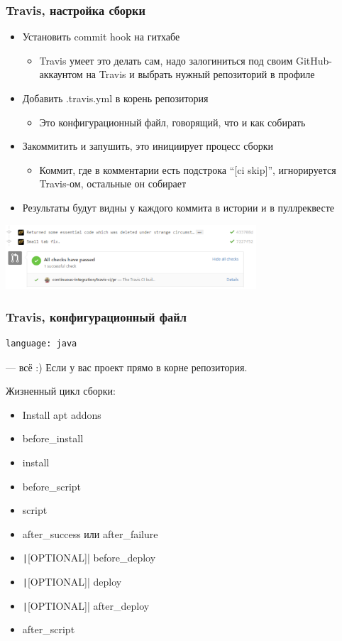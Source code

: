 \documentclass[xetex,mathserif,serif]{beamer}
\begin{document}
	\begin{frame}
		\frametitle{Travis, настройка сборки}
		\begin{itemize}
			\item Установить commit hook на гитхабе
			\begin{itemize}
				\item Travis умеет это делать сам, надо залогиниться под своим GitHub-аккаунтом на Travis и выбрать нужный репозиторий в профиле
			\end{itemize}
			\item Добавить .travis.yml в корень репозитория
			\begin{itemize}
				\item Это конфигурационный файл, говорящий, что и как собирать
			\end{itemize}
			\item Закоммитить и запушить, это инициирует процесс сборки
			\begin{itemize}
				\item Коммит, где в комментарии есть подстрока ``[ci skip]'', игнорируется Travis-ом, остальные он собирает
			\end{itemize}
			\item Результаты будут видны у каждого коммита в истории и в пуллреквесте
		\end{itemize}
		\begin{center}
			\includegraphics[width=0.7\textwidth]{travisSuccess.png}
		\end{center}
	\end{frame}

	\begin{frame}[fragile]
		\frametitle{Travis, конфигурационный файл}
		\begin{verbatim}
language: java
		\end{verbatim}
		--- всё :) Если у вас проект прямо в корне репозитория.

		Жизненный цикл сборки:
		\begin{footnotesize}
			\begin{itemize}
				\item Install apt addons
				\item before\_install
				\item install
				\item before\_script
				\item script
				\item after\_success или after\_failure
				\item \texttt|[OPTIONAL]| before\_deploy
				\item \texttt|[OPTIONAL]| deploy
				\item \texttt|[OPTIONAL]| after\_deploy
				\item after\_script
			\end{itemize}
		\end{footnotesize}
	\end{frame}
\end{document}
